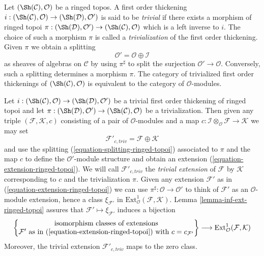 \begin{remark}
\label{remark-trivial-thickening-ringed-topoi}
Let $(\Sh(\mathcal{C}), \mathcal{O})$ be a ringed topos. A first order
thickening $i : (\Sh(\mathcal{C}), \mathcal{O}) \to
(\Sh(\mathcal{D}), \mathcal{O}')$ is said
to be {\it trivial} if there exists a morphism of ringed topoi
$\pi : (\Sh(\mathcal{D}), \mathcal{O}') \to (\Sh(\mathcal{C}), \mathcal{O})$
which is a left inverse to $i$. The choice of such a morphism
$\pi$ is called a {\it trivialization} of the first order thickening.
Given $\pi$ we obtain a splitting
\begin{equation}
\label{equation-splitting-ringed-topoi}
\mathcal{O}' = \mathcal{O} \oplus \mathcal{I}
\end{equation}
as sheaves of algebras on $\mathcal{C}$ by using $\pi^\sharp$
to split the surjection $\mathcal{O}' \to \mathcal{O}$.
Conversely, such a splitting determines
a morphism $\pi$. The category of trivialized first order thickenings of
$(\Sh(\mathcal{C}), \mathcal{O})$ is equivalent to the category of 
$\mathcal{O}$-modules.
\end{remark}

\begin{remark}
\label{remark-trivial-extension-ringed-topoi}
Let $i : (\Sh(\mathcal{C}), \mathcal{O}) \to (\Sh(\mathcal{D}), \mathcal{O}')$
be a trivial first order thickening of ringed topoi
and let $\pi : (\Sh(\mathcal{D}), \mathcal{O}') \to
(\Sh(\mathcal{C}), \mathcal{O})$ be a trivialization. Then given any triple
$(\mathcal{F}, \mathcal{K}, c)$ consisting of a pair of
$\mathcal{O}$-modules and a map
$c : \mathcal{I} \otimes_\mathcal{O} \mathcal{F} \to \mathcal{K}$
we may set
$$
\mathcal{F}'_{c, triv} = \mathcal{F} \oplus \mathcal{K}
$$
and use the splitting (\ref{equation-splitting-ringed-topoi})
associated to $\pi$ and the map $c$ to define the $\mathcal{O}'$-module
structure and obtain an extension (\ref{equation-extension-ringed-topoi}).
We will call $\mathcal{F}'_{c, triv}$ the {\it trivial extension} of
$\mathcal{F}$ by $\mathcal{K}$ corresponding
to $c$ and the trivialization $\pi$. Given any extension
$\mathcal{F}'$ as in (\ref{equation-extension-ringed-topoi}) we can use
$\pi^\sharp : \mathcal{O} \to \mathcal{O}'$ to think of $\mathcal{F}'$
as an $\mathcal{O}$-module extension, hence a class $\xi_{\mathcal{F}'}$
in $\text{Ext}^1_\mathcal{O}(\mathcal{F}, \mathcal{K})$.
Lemma \ref{lemma-inf-ext-ringed-topoi} assures that
$\mathcal{F}' \mapsto \xi_{\mathcal{F}'}$
induces a bijection
$$
\left\{
\begin{matrix}
\text{isomorphism classes of extensions}\\
\mathcal{F}'\text{ as in (\ref{equation-extension-ringed-topoi}) with }
c = c_{\mathcal{F}'}
\end{matrix}
\right\}
\longrightarrow
\text{Ext}^1_\mathcal{O}(\mathcal{F}, \mathcal{K})
$$
Moreover, the trivial extension $\mathcal{F}'_{c, triv}$ maps to the zero class.
\end{remark}

